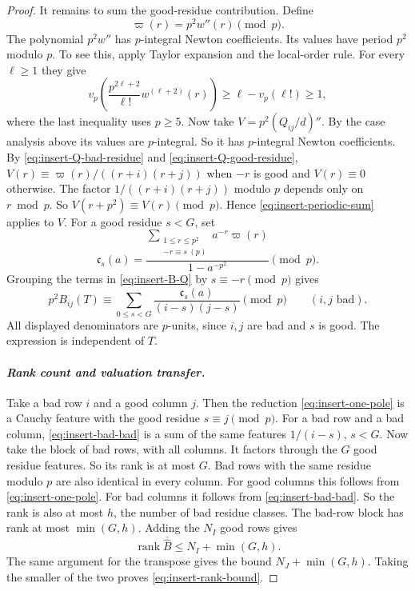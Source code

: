\begin{proof}
It remains to sum the good-residue contribution.  Define
\[
 \varpi(r)=p^2w''(r)\pmod p.
\]
The polynomial $p^2w''$ has $p$-integral Newton coefficients.  Its values
have period $p^2$ modulo $p$.  To see this, apply Taylor expansion and the
local-order rule.  For every $\ell\geq1$ they give
\begin{equation}
 v_p\!\left(\frac{p^{2\ell+2}}{\ell!}
              w^{(\ell+2)}(r)\right)
 \geq \ell-v_p(\ell!)\geq1,
 \label{eq:insert-z-period}
\end{equation}
where the last inequality uses $p\geq5$.  Now take $V=p^2(Q_{ij}/d)''$.
By the case analysis above its values are $p$-integral.  So it has
$p$-integral Newton coefficients.  By
\eqref{eq:insert-Q-bad-residue} and \eqref{eq:insert-Q-good-residue},
$V(r)\equiv \varpi(r)/((r+i)(r+j))$ when $-r$ is good and $V(r)\equiv0$
otherwise.  The factor $1/((r+i)(r+j))$ modulo $p$ depends only on
$r\bmod p$.  So $V(r+p^2)\equiv V(r)\pmod p$.  Hence
\eqref{eq:insert-periodic-sum} applies to $V$.  For a good residue $s<G$, set
\begin{equation}
 \mathfrak c_s(a)=\frac{\displaystyle
       \sum_{\substack{1\leq r\leq p^2\\-r\equiv s\ (p)}}a^{-r}\varpi(r)}
       {1-a^{-p^2}}\pmod p.
 \label{eq:insert-Cs}
\end{equation}
Grouping the terms in \eqref{eq:insert-B-Q} by $s\equiv-r\pmod p$ gives
\begin{equation}
 p^2B_{ij}(T)
 \equiv \sum_{0\leq s<G}
       \frac{\mathfrak c_s(a)}{(i-s)(j-s)}\pmod p
 \qquad(i,j\text{ bad}).
 \label{eq:insert-bad-bad}
\end{equation}
All displayed denominators are $p$-units, since $i,j$ are bad and $s$ is
good.  The expression is independent of $T$.

\paragraph{\emph{Rank count and valuation transfer.}}
Take a bad row $i$ and a good column $j$.  Then the reduction
\eqref{eq:insert-one-pole} is a Cauchy feature with the good residue $s\equiv j\pmod p$.
For a bad row and a bad column, \eqref{eq:insert-bad-bad} is a sum of the
same features $1/(i-s)$, $s<G$.  Now take the block of bad rows, with all
columns.  It factors through the $G$ good residue features.  So its rank is
at most $G$.  Bad rows with the same residue modulo $p$ are also identical in
every column.  For good columns this follows from
\eqref{eq:insert-one-pole}.  For bad columns it follows from
\eqref{eq:insert-bad-bad}.  So the rank is also at most $h$, the number of
bad residue classes.  The bad-row block has rank at most $\min(G,h)$.
Adding the $N_I$ good rows gives
\begin{equation}
 \operatorname{rank}\overline{\widehat B}
 \leq N_I+\min(G,h).
 \label{eq:insert-rank-I}
\end{equation}
The same argument for the transpose gives the bound
$N_J+\min(G,h)$.  Taking the smaller of the two proves
\eqref{eq:insert-rank-bound}.


\end{proof}
